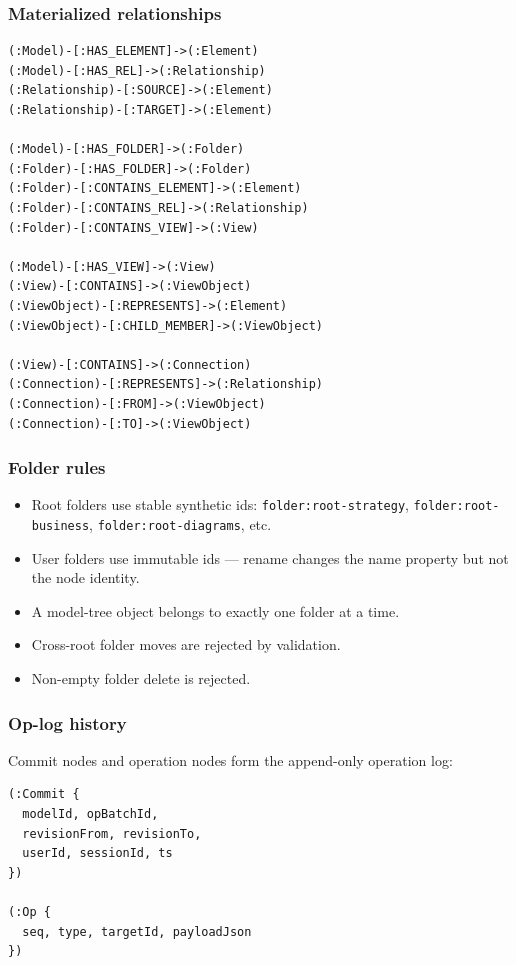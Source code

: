 \subsubsection{Materialized relationships}

\begin{lstlisting}[caption={Core relationships}]
(:Model)-[:HAS_ELEMENT]->(:Element)
(:Model)-[:HAS_REL]->(:Relationship)
(:Relationship)-[:SOURCE]->(:Element)
(:Relationship)-[:TARGET]->(:Element)

(:Model)-[:HAS_FOLDER]->(:Folder)
(:Folder)-[:HAS_FOLDER]->(:Folder)
(:Folder)-[:CONTAINS_ELEMENT]->(:Element)
(:Folder)-[:CONTAINS_REL]->(:Relationship)
(:Folder)-[:CONTAINS_VIEW]->(:View)

(:Model)-[:HAS_VIEW]->(:View)
(:View)-[:CONTAINS]->(:ViewObject)
(:ViewObject)-[:REPRESENTS]->(:Element)
(:ViewObject)-[:CHILD_MEMBER]->(:ViewObject)

(:View)-[:CONTAINS]->(:Connection)
(:Connection)-[:REPRESENTS]->(:Relationship)
(:Connection)-[:FROM]->(:ViewObject)
(:Connection)-[:TO]->(:ViewObject)
\end{lstlisting}

\subsubsection{Folder rules}

\begin{itemize}
\item Root folders use stable synthetic ids:
  \texttt{folder:root-strategy}, \texttt{folder:root-business},
  \texttt{folder:root-diagrams}, etc.
\item User folders use immutable ids --- rename changes the name property
  but not the node identity.
\item A model-tree object belongs to exactly one folder at a time.
\item Cross-root folder moves are rejected by validation.
\item Non-empty folder delete is rejected.
\end{itemize}

\subsubsection{Op-log history}

Commit nodes and operation nodes form the append-only operation log:

\begin{lstlisting}[caption={Op-log nodes}]
(:Commit {
  modelId, opBatchId,
  revisionFrom, revisionTo,
  userId, sessionId, ts
})

(:Op {
  seq, type, targetId, payloadJson
})
\end{lstlisting}


